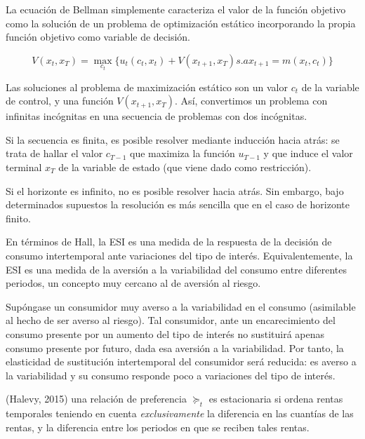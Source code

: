 \documentclass{nuevotema}
\begin{document}

La ecuación de Bellman simplemente caracteriza el valor de la función objetivo como la solución de un problema de optimización estático incorporando la propia función objetivo como variable de decisión. 

\begin{equation}
V(x_t, x_T) = \underset{c_t}{\max} \lbrace u_t(c_t, x_t) +  V(x_{t+1}, x_T) s.a x_{t+1} = m(x_t, c_t) \rbrace 
\end{equation}

Las soluciones al problema de maximización estático son un valor $c_t$ de la variable de control, y una función $V(x_{t+1}, x_T)$. Así, convertimos un problema con infinitas incógnitas en una secuencia de problemas con dos incógnitas. 

Si la secuencia es finita, es posible resolver mediante inducción hacia atrás: se trata de hallar el valor $c_{T-1}$ que maximiza la función $u_{T-1}$ y que induce el valor terminal $x_T$ de la variable de estado (que viene dado como restricción).

Si el horizonte es infinito, no es posible resolver hacia atrás. Sin embargo, bajo determinados supuestos la resolución es más sencilla que en el caso de horizonte finito.


En términos de Hall, la ESI es una medida de la respuesta de la decisión de consumo intertemporal ante variaciones del tipo de interés. Equivalentemente, la ESI es una medida de la aversión a la variabilidad del consumo entre diferentes periodos, un concepto muy cercano al de aversión al riesgo.

Supóngase un consumidor muy averso a la variabilidad en el consumo (asimilable al hecho de ser averso al riesgo). Tal consumidor, ante un encarecimiento del consumo presente por un aumento del tipo de interés no sustituirá apenas consumo presente por futuro, dada esa aversión a la variabilidad. Por tanto, la elasticidad de sustitución intertemporal del consumidor será reducida: es averso a la variabilidad y su consumo responde poco a variaciones del tipo de interés.


(Halevy, 2015) una relación de preferencia $\succeq_t$ es estacionaria si ordena rentas temporales teniendo en cuenta \textit{exclusivamente} la diferencia en las cuantías de las rentas, y la diferencia entre los periodos en que se reciben tales rentas.
\end{document}
